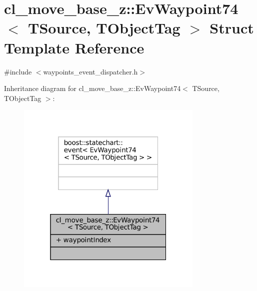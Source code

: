 \hypertarget{structcl__move__base__z_1_1EvWaypoint74}{}\section{cl\+\_\+move\+\_\+base\+\_\+z\+:\+:Ev\+Waypoint74$<$ T\+Source, T\+Object\+Tag $>$ Struct Template Reference}
\label{structcl__move__base__z_1_1EvWaypoint74}


{\ttfamily \#include $<$waypoints\+\_\+event\+\_\+dispatcher.\+h$>$}



Inheritance diagram for cl\+\_\+move\+\_\+base\+\_\+z\+:\+:Ev\+Waypoint74$<$ T\+Source, T\+Object\+Tag $>$\+:
\nopagebreak
\begin{figure}[H]
\begin{center}
\leavevmode
\includegraphics[width=253pt]{structcl__move__base__z_1_1EvWaypoint74__inherit__graph}
\end{center}
\end{figure}



